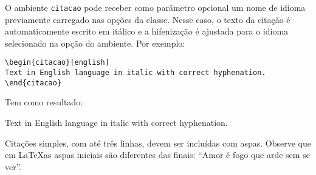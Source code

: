 O ambiente \texttt{citacao} pode receber como parâmetro opcional um nome de
idioma previamente carregado nas opções da classe. Nesse
caso, o texto da citação é automaticamente escrito em itálico e a hifenização é
ajustada para o idioma selecionado na opção do ambiente. Por exemplo:

\begin{verbatim}
\begin{citacao}[english]
Text in English language in italic with correct hyphenation.
\end{citacao}
\end{verbatim}

Tem como resultado:

\begin{citacao}[english]
Text in English language in italic with correct hyphenation.
\end{citacao}

Citações simples, com até três linhas, devem ser
incluídas com aspas. Observe que em \LaTeX as aspas iniciais são diferentes das
finais: ``Amor é fogo que arde sem se ver''.

